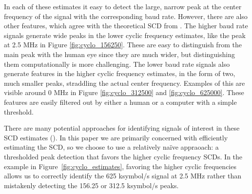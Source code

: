 \documentclass[12pt]{article}
\begin{document}
In each of these estimates it easy to detect the large, narrow peak at the
center frequency of the signal with the corresponding baud rate. However, there
are also other features, which agree with the theoretical SCD from
\cite{Gardner2}.  The higher baud rate signals generate wide peaks in the lower
cyclic frequency estimates, like the peak at 2.5 MHz in Figure
\ref{fig:cyclo_156250}. These are easy to distinguish from the main peak with
the human eye since they are much wider, but distinguishing them computationally
is more challenging. The lower baud rate signals also generate features in the
higher cyclic frequency estimates, in the form of two, much smaller peaks,
straddling the actual center frequency. Examples of this are visible around 0 MHz
in Figure \ref{fig:cyclo_312500} and \ref{fig:cyclo_625000}. These features are
easily filtered out by either a human or a computer with a simple threshold.

There are many potential approaches for identifying signals of interest in
these SCD estimates (\cite{Oner1}). In this paper we are primarily concerned
with efficiently estimating the SCD, so we choose to use a relatively na{\"i}ve
appraoach: a thresholded peak detection that favors the higher cyclic frequency
SCDs. In the example in Figure~\ref{fig:cyclo_estimates}, favoring the higher
cyclic frequencies allows us to correctly identify the 625 ksymbol/s signal at
2.5 MHz rather than mistakenly detecting the 156.25 or 312.5 ksymbol/s peaks.
\end{document}
